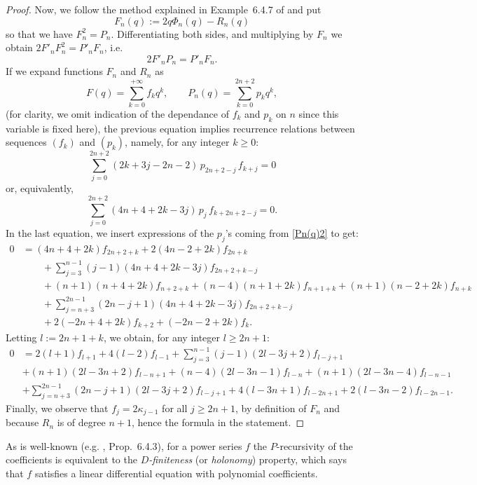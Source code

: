 \documentclass[11pt,reqno]{amsart}
\theoremstyle{plain}
\theoremstyle{definition}
\numberwithin{figure}{section}
\numberwithin{table}{section}
\numberwithin{equation}{section}
\newcommand\ka{\kappa}
\begin{document}
\begin{proof}
Now, we follow the method explained in Example~6.4.7 of \cite{StanleyEC2} and  put 
$$F_n(q):=2q\Phi_n(q)-R_n(q)$$
so that we have $F_n^2=P_n$. Differentiating both sides, and multiplying by $F_n$ we obtain
$2F'_n F_n^2=P'_n F_n$, i.e.
\begin{equation*}
2F'_n P_n=P'_n F_n.
\end{equation*}
If we expand functions $F_n$ and $R_n$ as
\begin{equation*}
F(q)=\sum_{k=0}^{+\infty}f_{k}q^k,\qquad P_n(q)=\sum_{k=0}^{2n+2}p_{k}q^k,
\end{equation*}
(for clarity, we omit indication of the dependance of $f_k$ and $p_k$ on $n$ since this variable is fixed here), the previous equation implies recurrence relations between sequences $(f_k)$ and $(p_k)$, namely, for any  integer $k≥0$:
\begin{equation*}
\sum_{j=0}^{2n+2}(2k+3j-2n-2)\,p_{2n+2-j}\,f_{k+j}=0
\end{equation*}
or, equivalently, 
\begin{equation*}
\sum_{j=0}^{2n+2}(4n+4+2k-3j)\,p_{j}\,f_{k+2n+2-j}=0.
\end{equation*}
In the last equation, we insert expressions of the $p_j$'s coming from \eqref{Pn(q)2} to get:
\begin{align*}
0&=(4n+4+2k)f_{2n+2+k}+2(4n-2+2k)f_{2n+k}\\
&\qquad +\sum_{j=3}^{n-1}(j-1)(4n+4+2k-3j)f_{2n+2+k-j}\\
&\qquad+(n+1)(n+4+2k)f_{n+2+k}+(n-4)(n+1+2k)f_{n+1+k}+(n+1)(n-2+2k)f_{n+k}\\
&\qquad +\sum_{j=n+3}^{2n-1}(2n-j+1)(4n+4+2k-3j)f_{2n+2+k-j}\\
&\qquad +2(-2n+4+2k)f_{k+2}+(-2n-2+2k)f_{k}.
\end{align*}
Letting $l:=2n+1+k$, we obtain, for any integer $l≥2n+1$:
\begin{align*}
0&=2(l+1)f_{l+1}+4(l-2)f_{l-1}+\sum_{j=3}^{n-1}(j-1)(2l-3j+2)f_{l-j+1}\\
&+(n+1)(2l-3n+2)f_{l-n+1}+(n-4)(2l-3n-1)f_{l-n}+(n+1)(2l-3n-4)f_{l-n-1}\\
&+\sum_{j=n+3}^{2n-1}(2n-j+1)(2l-3j+2)f_{l-j+1}
+4(l-3n+1)f_{l-2n+1}+2(l-3n-2)f_{l-2n-1}.
\end{align*}
Finally, we observe that $f_j=2\ka_{j-1}$ for all $j≥2n+1$, by definition of $F_n$ and because $R_n$ is of degree $n+1$, hence the formula in the statement.
\end{proof}

As is well-known (e.g. \cite{StanleyEC2}, Prop.~6.4.3), for a power series $f$ the $P$-recursivity of the coefficients is equivalent to the \emph{$D$-finiteness} (or \emph{holonomy}) property, which says that $f$ satisfies a linear differential equation with polynomial coefficients.
\end{document}
